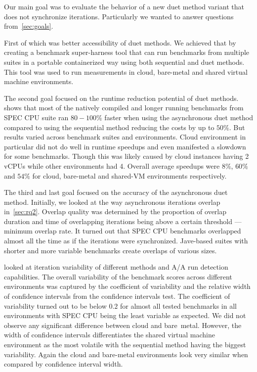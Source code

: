 
Our main goal was to evaluate the behavior of a new duet method variant that does not synchronize iterations.
Particularly we wanted to answer questions from~\cref{sec:goals}.

First of which was better accessibility of duet methods.
We achieved that by creating a benchmark super-harness tool that can run benchmarks from multiple suites in a portable containerized way using both sequential and duet methods.
This tool was used to run measurements in cloud, bare-metal and shared virtual machine environments.

The second goal focused on the runtime reduction potential of duet methods.
 shows that most of the natively compiled and longer running benchmarks from SPEC CPU suite ran $80 - 100\%$ faster when using the asynchronous duet method compared to using the sequential method reducing the costs by up to $50\%$.
But results varied across benchmark suites and environments.
Cloud environment in particular did not do well in runtime speedups and even manifested a slowdown for some benchmarks.
Though this was likely caused by cloud instances having 2 vCPUs while other environments had 4.
Overall average speedups were $8\%$, $60\%$ and $54\%$ for cloud, \mbox{bare-metal} and \mbox{shared-VM} environments respectively.

The third and last goal focused on the accuracy of the asynchronous duet method.
Initially, we looked at the way asynchronous iterations overlap in~\cref{sec:rq2}.
Overlap quality was determined by the proportion of overlap duration and time of overlapping iterations being above a certain threshold --- minimum overlap rate.
It turned out that SPEC CPU benchmarks overlapped almost all the time as if the iterations were synchronized.
\mbox{Jave-based} suites with shorter and more variable benchmarks create overlaps of various sizes.

 looked at iteration variability of different methods and A/A run detection capabilities.
The overall variability of the benchmark scores across different environments was captured by the coefficient of variability and the relative width of confidence intervals from the confidence intervals test.
The coefficient of variability turned out to be below $0.2$ for almost all tested benchmarks in all environments with SPEC CPU being the least variable as expected.
We did not observe any significant difference between cloud and \mbox{bare metal}.
However, the width of confidence intervals differentiates the shared virtual machine environment as the most volatile with the sequential method having the biggest variability.
Again the cloud and \mbox{bare-metal} environments look very similar when compared by confidence interval width.

